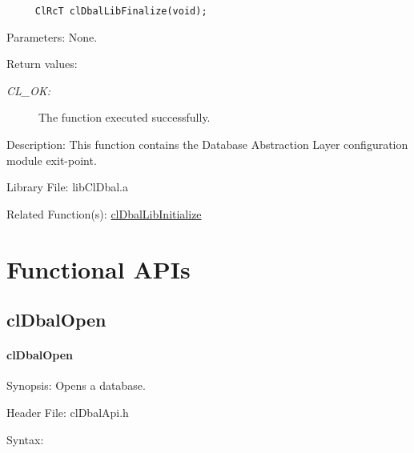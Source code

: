 \begin{flushleft}
\begin{Desc}
\footnotesize\begin{verbatim}     ClRcT clDbalLibFinalize(void);
\end{verbatim}
\normalsize
\end{Desc}
\begin{Desc}
\item[Parameters:]None.\end{Desc}
\begin{Desc}
\item[Return values:]
\begin{description}
\item[{\em CL\_\-OK:}]The function executed successfully.\end{description}
\end{Desc}
\begin{Desc}
\item[Description:]This function contains the Database Abstraction Layer configuration module exit-point.\end{Desc}
\begin{Desc}
\item[Library File:]lib\-Cl\-Dbal.a\end{Desc}
\begin{Desc}
\item[Related Function(s):]\hyperlink{pagedbal201}{cl\-Dbal\-Lib\-Initialize } \end{Desc}

\newpage


\section{Functional APIs}
\subsection{clDbalOpen}
\hypertarget{pagedbal103}{}\paragraph{cl\-Dbal\-Open}\label{pagedbal103}
\begin{Desc}
\item[Synopsis:]Opens a database.\end{Desc}
\begin{Desc}
\item[Header File:]clDbalApi.h\end{Desc}
\begin{Desc}
\item[Syntax:]


\end{Desc}
\end{flushleft}
